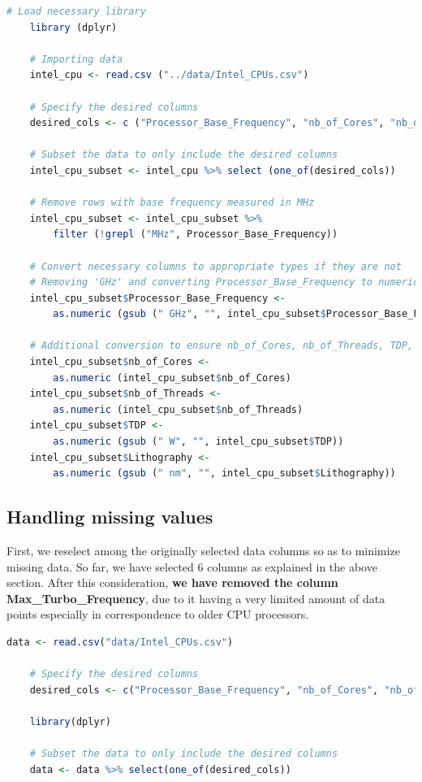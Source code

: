 \begin{lstlisting}[language=R]
    # Load necessary library
    library (dplyr)

    # Importing data
    intel_cpu <- read.csv ("../data/Intel_CPUs.csv")

    # Specify the desired columns
    desired_cols <- c ("Processor_Base_Frequency", "nb_of_Cores", "nb_of_Threads", "TDP", "Lithography")

    # Subset the data to only include the desired columns
    intel_cpu_subset <- intel_cpu %>% select (one_of(desired_cols))

    # Remove rows with base frequency measured in MHz
    intel_cpu_subset <- intel_cpu_subset %>%
        filter (!grepl ("MHz", Processor_Base_Frequency))

    # Convert necessary columns to appropriate types if they are not
    # Removing 'GHz' and converting Processor_Base_Frequency to numeric
    intel_cpu_subset$Processor_Base_Frequency <- 
        as.numeric (gsub (" GHz", "", intel_cpu_subset$Processor_Base_Frequency))

    # Additional conversion to ensure nb_of_Cores, nb_of_Threads, TDP, and Lithography are numeric where applicable
    intel_cpu_subset$nb_of_Cores <- 
        as.numeric (intel_cpu_subset$nb_of_Cores)
    intel_cpu_subset$nb_of_Threads <- 
        as.numeric (intel_cpu_subset$nb_of_Threads)
    intel_cpu_subset$TDP <- 
        as.numeric (gsub (" W", "", intel_cpu_subset$TDP))
    intel_cpu_subset$Lithography <- 
        as.numeric (gsub (" nm", "", intel_cpu_subset$Lithography))

\end{lstlisting}

\vspace*{1cm}

\subsection{Handling missing values}

First, we reselect among the originally selected data columns so as to minimize missing data. So far, we have selected 6 columns as explained in the above section. After this consideration, \textbf{we have removed the column Max\_Turbo\_Frequency}, due to it having a very limited amount of data points especially in correspondence to older CPU processors.\\

\begin{lstlisting}[language=R]
    data <- read.csv("data/Intel_CPUs.csv")

    # Specify the desired columns
    desired_cols <- c("Processor_Base_Frequency", "nb_of_Cores", "nb_of_Threads", "TDP", "Lithography")

    library(dplyr)

    # Subset the data to only include the desired columns
    data <- data %>% select(one_of(desired_cols))
\end{lstlisting}

